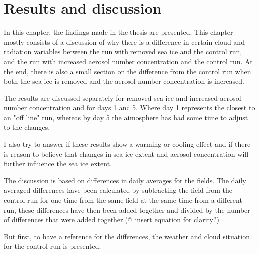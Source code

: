 \chapter{Results and discussion}
\label{chap:results}
In this chapter, the findings made in the thesis are presented. This chapter mostly consists of a discussion of why there is a difference in certain cloud and radiation variables between the run with removed sea ice and the control run, and the run with increased aerosol number concentration and the control run. At the end, there is also a small section on the difference from the control run when both the sea ice is removed and the aerosol number concentration is increased.

The results are discussed separately for removed sea ice and increased aerosol number concentration and for days 1 and 5. Where day 1 represents the closest to an "off line" run, whereas by day 5 the atmosphere has had some time to adjust to the changes.

I also try to answer if these results show a warming or cooling effect and if there is reason to believe that changes in sea ice extent and aerosol concentration will further influence the sea ice extent.

The discussion is based on differences in daily averages for the fields. The daily averaged differences have been calculated by subtracting the field from the control run for one time from the same field at the same time from a different run, these differences have then been added together and divided by the number of differences that were added together.(@ insert equation for clarity?)

But first, to have a reference for the differences, the weather and cloud situation for the control run is presented.

